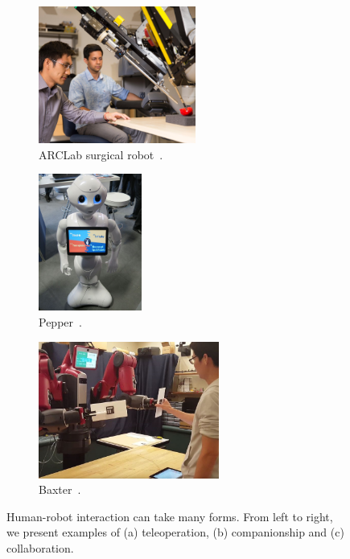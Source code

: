 \begin{figure}[h]\centering
    \begin{subfigure}{0.34\textwidth}\centering
        \includegraphics[height=4.5cm]{figures/teleoperated.jpg} 
        \caption{ARCLab surgical robot~\cite{arclab_2019}.}
        \label{subfig:teleoperated}
    \end{subfigure}
    \begin{subfigure}{0.2\textwidth}\centering
        \includegraphics[height=4.5cm]{figures/companion.JPG}
        \caption{Pepper~\cite{travelarz_2017}.}
        \label{subfig:companion}
    \end{subfigure}
    \begin{subfigure}{0.41\textwidth}\centering
        \includegraphics[height=4.5cm]{figures/collaboration.JPG}
        \caption{Baxter~\cite{roncone2017transparent}.}
        \label{subfig:companion}
    \end{subfigure}
    \caption{Human-robot interaction can take many forms. From left to right, we present examples of (a) teleoperation, (b) companionship and (c) collaboration.}
    \label{fig:hri}
\end{figure}

